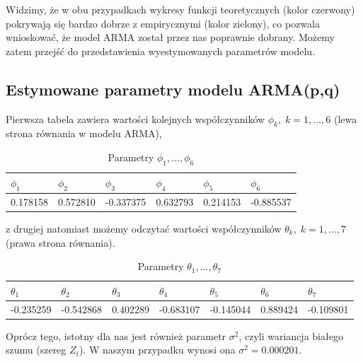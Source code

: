 \documentclass[fleqn]{article}
\theoremstyle{plain}
\begin{document}
    \vskip 0.2in
    Widzimy, że w obu przypadkach wykresy funkcji teoretycznych (kolor czerwony) pokrywają się bardzo dobrze z empirycznymi (kolor zielony), 
    co pozwala wnioskować, że model ARMA został przez nas poprawnie dobrany. Możemy zatem przejść do przedstawienia
    wyestymowanych parametrów modelu.


    \subsection*{Estymowane parametry modelu ARMA(p,q)}

    Pierwsza tabela zawiera wartości kolejnych współczynników $\phi_{k}, \; k=1,\ldots,6$ (lewa strona równania w modelu ARMA),
    \begin{table}[H]
        \centering
        \begin{tabular}{|l|l|l|l|l|l|}
        \hline
        $\phi_1$ & $\phi_2$ & $\phi_3$ & $\phi_4$ & $\phi_5$ & $\phi_6$\\
        \hline
        0.178158 & 0.572810 & -0.337375 & 0.632793 & 0.214153 & -0.885537\\
        \hline
        \end{tabular}
        \label{tab:phis_estimated}
        \caption{Parametry $\phi_1,...,\phi_6$}
    \end{table}

    \noindent z drugiej natomiast możemy odczytać wartości współczynników $\theta_{k}, \; k=1,\ldots,7$ (prawa strona równania).

    \begin{table}[H]
        \centering
        \begin{tabular}{|l|l|l|l|l|l|l|}
        \hline
        $\theta_1$ & $\theta_2$ & $\theta_3$ & $\theta_4$ & $\theta_5$ & $\theta_6$ & $\theta_7$\\
        \hline
        -0.235259  & -0.542868  & 0.402289  &  -0.683107 & -0.145044  & 0.889424 & -0.109801\\
        \hline
        \end{tabular}
        \label{tab:thetas_estimated}
        \caption{Parametry $\theta_1,...,\theta_7$}
    \end{table}

    Oprócz tego, istotny dla nas jest również parametr $\sigma^2$, czyli wariancja białego szumu (szereg $Z_t$).
    W naszym przypadku wynosi ona $\sigma^2 = 0.000201$.

    \newpage
\end{document}
